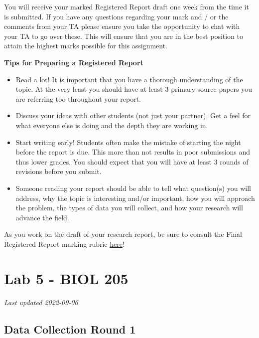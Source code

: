 \documentclass[
]{book}
\providecommand{\tightlist}{%
  \setlength{\itemsep}{0pt}\setlength{\parskip}{0pt}}
\begin{document}
You will receive your marked Registered Report draft one week from the time it is submitted. If you have any questions regarding your mark and / or the comments from your TA please ensure you take the opportunity to chat with your TA to go over these. This will ensure that you are in the best position to attain the highest marks possible for this assignment.

\textbf{Tips for Preparing a Registered Report}

\begin{itemize}
\tightlist
\item
  Read a lot! It is important that you have a thorough understanding of the topic. At the very least you should have at least 3 primary source papers you are referring too throughout your report.
\item
  Discuss your ideas with other students (not just your partner). Get a feel for what everyone else is doing and the depth they are working in.
\item
  Start writing early! Students often make the mistake of starting the night before the report is due. This more than not results in poor submissions and thus lower grades. You should expect that you will have at least 3 rounds of revisions before you submit.
\item
  Someone reading your report should be able to tell what question(s) you will address, why the topic is interesting and/or important, how you will approach the problem, the types of data you will collect, and how your research will advance the field.
\end{itemize}

As you work on the draft of your research report, be sure to consult the Final Registered Report marking rubric \href{https://ubco-biology.github.io/BIOL-205-Lab-Manual/registered-report-rubric.html}{here}!

\hypertarget{part-lab-5---biol-205}{%
\part*{Lab 5 - BIOL 205}\label{part-lab-5---biol-205}}

\emph{Last updated 2022-09-06}

\hypertarget{data-collection-round-1}{%
\chapter*{Data Collection Round 1}\label{data-collection-round-1}}
\end{document}

